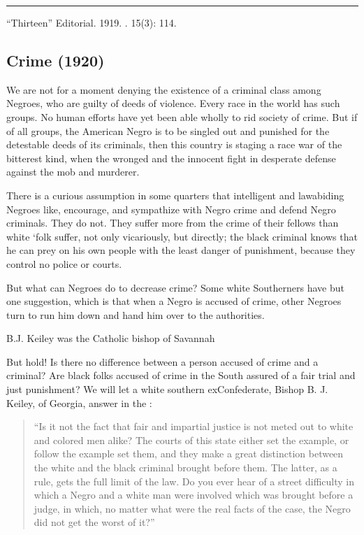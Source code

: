 \documentclass[letterpaper,10pt,english]{jupyterBook}
\begin{document}
\bigskip\hrule\bigskip


\sphinxAtStartPar
{} “Thirteen” Editorial. 1919. . 15(3): 114.


\subsection{Crime (1920)}
\label{\detokenize{Volumes/19/04/crime:crime-1920}}\label{\detokenize{Volumes/19/04/crime::doc}}
\sphinxAtStartPar
We are not for a moment denying the existence of a criminal class among Negroes, who are guilty of deeds of violence. Every race in the world has such groups. No human efforts have yet been able wholly to rid society of crime. But if of all groups, the American Negro is to be singled out and punished  for the detestable deeds of its criminals, then this country is staging a race war of the bitterest kind, when the wronged and the innocent fight in desperate defense against the mob and murderer.

\sphinxAtStartPar
There is a curious assumption in some quarters that intelligent and law\sphinxhyphen{}abiding Negroes like, encourage, and sympathize with Negro crime and defend Negro criminals. They do not. They suffer more from the crime of their fellows than white ‘folk suffer, not only vicariously, but directly; the black criminal knows that he can prey on his own people with the least danger of punishment, because they control no police or courts.

\sphinxAtStartPar
But what can Negroes do to decrease crime? Some white Southerners have but one suggestion, which is that when a Negro is accused of crime, other Negroes turn to run him down and hand him over to the authorities.

\begin{sphinxShadowBox}
\sphinxstylesidebartitle{}

\sphinxAtStartPar
B.J. Keiley was the Catholic bishop of Savannah
\end{sphinxShadowBox}

\sphinxAtStartPar
But hold! Is there no difference between a person accused of crime and a criminal? Are black folks accused of crime in the South assured of a fair trial and just punishment? We will let a white southern ex\sphinxhyphen{}Confederate, Bishop B. J. Keiley, of Georgia, answer in the :
\begin{quote}

\sphinxAtStartPar
“Is it not the fact that fair and impartial justice is not meted out to white and colored men alike? The courts of this state either set the example, or follow the example set them, and they make a great distinction between the white and the black criminal brought before them. The latter, as a rule, gets the full limit of the law. Do you ever hear of a street difficulty in which a Negro and a white man were involved which was brought before a judge, in which, no matter what were the real facts of the case, the Negro did not get the worst of it?”
\end{quote}
\end{document}
